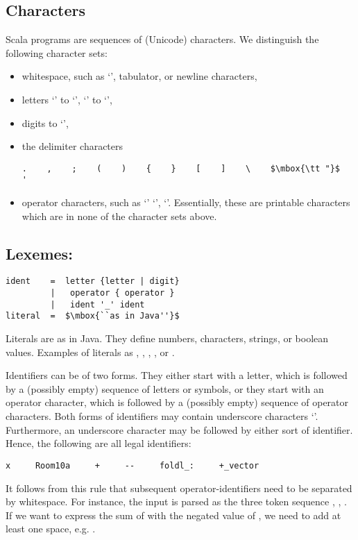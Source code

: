 \subsection*{Characters}

Scala programs are sequences of (Unicode) characters. We distinguish the
following character sets:
\begin{itemize}
\item
whitespace, such as `\code{ }', tabulator, or newline characters,
\item
letters `' to `', `' to `',
\item
digits  to `',
\item
the delimiter characters

\begin{lstlisting}
.    ,    ;    (    )    {    }    [    ]    \    $\mbox{\tt "}$    '
\end{lstlisting}

\item
operator characters, such as `\code{#}' `\code{+}',
`\code{:}'. Essentially, these are printable characters which are
in none of the character sets above.
\end{itemize}

\subsection*{Lexemes:}

\begin{lstlisting}
ident    =  letter {letter | digit}
         |   operator { operator }
         |   ident '_' ident
literal  =  $\mbox{``as in Java''}$
\end{lstlisting}

Literals are as in Java. They define numbers, characters, strings, or
boolean values.  Examples of literals as , , ,
, or .

Identifiers can be of two forms. They either start with a letter,
which is followed by a (possibly empty) sequence of letters or
symbols, or they start with an operator character, which is followed
by a (possibly empty) sequence of operator characters.  Both forms of
identifiers may contain underscore characters `\code{_}'. Furthermore,
an underscore character may be followed by either sort of
identifier. Hence, the following are all legal identifiers:
\begin{lstlisting}
x     Room10a     +     --     foldl_:     +_vector
\end{lstlisting}
It follows from this rule that subsequent operator-identifiers need to
be separated by whitespace. For instance, the input
 is parsed as the three token sequence , \code{+-},
. If we want to express the sum of  with the
negated value of , we need to add at least one space,
e.g. .

